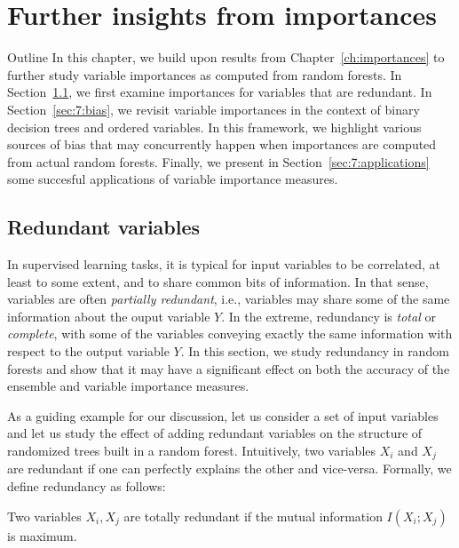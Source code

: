 \chapter{Further insights from importances}\label{ch:applications}

\begin{remark}{Outline}
In this chapter, we build upon results from Chapter~\ref{ch:importances} to
further study variable importances as computed from random forests. In
Section~\ref{sec:7:redundant}, we first examine importances for variables that
are redundant. In Section~\ref{sec:7:bias}, we revisit variable importances in
the context of binary decision trees and ordered variables. In this framework, we
highlight various sources of bias that may concurrently happen when
importances are computed from actual random forests. Finally, we present in
Section~\ref{sec:7:applications} some succesful applications
of variable importance measures.
\end{remark}


\section{Redundant variables}
\label{sec:7:redundant}

In supervised learning tasks, it is typical for input variables to be
correlated, at least to some extent, and to share common bits of information.
In that sense, variables are often \textit{partially redundant}, i.e.,
variables may share some of the same information about the ouput variable $Y$.
In the extreme, redundancy is \textit{total}  or \textit{complete}, with some
of the variables conveying exactly the same information with respect to the
output variable $Y$. In this section, we study redundancy in random forests and
show that it may have a significant effect on both the accuracy of the ensemble
and variable importance measures.

As a guiding example for our discussion, let us consider a set of input
variables and let us study the effect of adding redundant variables on the
structure of randomized trees built in a random forest. Intuitively, two
variables $X_i$ and $X_j$ are redundant if one can perfectly explains the other
and vice-versa. Formally, we define redundancy as follows:

\begin{definition}
Two variables $X_i, X_j$ are totally redundant if the mutual information
$I(X_i;X_j)$ is maximum.
\end{definition}

